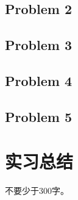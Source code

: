 \documentclass{swfulabreport}
\begin{document}
\subsection{Problem 2}

\subsection{Problem 3}

\subsection{Problem 4}

\subsection{Problem 5}

\section{实习总结}

不要少于300字。

\comments %
\end{document}
